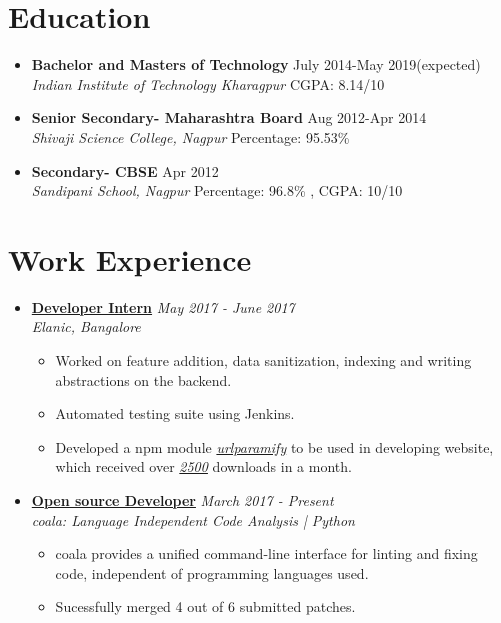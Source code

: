 \documentclass[10pt,a4paper]{moderncv}
\newcommand{\experience}[4]{
  \vspace{0.1cm}
  \item \textbf{\large{#1}} \hfill\textit{#3}\\\textit{#2}
  \begin{itemize}[leftmargin=*]
    \setlength\itemsep{0em} #4
  \end{itemize}
}
\newcommand{\education}[4]{
  \item \textbf{\large{#1}} \hfill #3\\\textit{#2} \hfill #4
}
\begin{document}
\maketitle
\vspace{-1cm}
\section*{Education}
\begin{itemize}
  \setlength\itemsep{1em}

  \education{Bachelor and Masters of Technology}{Indian Institute of Technology Kharagpur}{July 2014-May 2019(expected)}{CGPA: 8.14/10}
  \education{Senior Secondary- Maharashtra Board}{Shivaji Science College, Nagpur}{Aug 2012-Apr 2014}{Percentage: 95.53\%}
  \education{Secondary- CBSE}{Sandipani School, Nagpur}{Apr 2012}{Percentage: 96.8\% , CGPA: 10/10}
\end{itemize}

\section*{Work Experience}
\begin{itemize}
  \setlength\itemsep{0.5em}

  \experience{\href{https://drive.google.com/open?id=0B5iU6cWw36rOVWZIcllPY3RSd2c}{Developer Intern}}{Elanic, Bangalore}{May 2017 - June 2017}{
  	\item	Worked on feature addition, data sanitization, indexing and writing abstractions on the backend.
  	\item Automated testing suite using Jenkins.
  	\item Developed a npm module \href{https://www.npmjs.com/package/urlparamify}{\textit{urlparamify}} to be used in developing website, which received over \href{https://drive.google.com/open?id=0B5iU6cWw36rOd09Bc3ZNV1p4UTQ}{\textit{2500}} downloads in a month.
  }
    
  \experience{\href{https://github.com/orgs/coala/teams/coala-developers/members?&query=kaustubh}{Open source Developer}}{coala: Language Independent Code Analysis | Python}{March 2017 - Present}{
  	\item coala provides a unified command-line interface for linting and fixing code, independent of programming languages used.
  	\item Sucessfully merged 4 out of 6 submitted patches. 
  }

\end{itemize}
\end{document}
